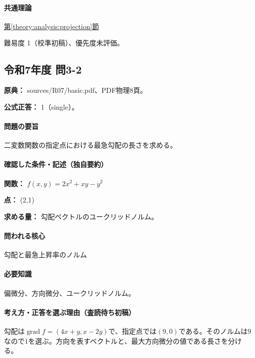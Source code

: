 \paragraph{共通理論} \hyperref[theory:analysis:projection]{第\ref*{theory:analysis:projection}節}

\par 難易度 1（校準初稿）、優先度未評価。

\subsection{令和7年度 問3-2}
\label{q:r07-reg-basic-3-2}

\noindent\textbf{原典：} sources/R07/basic.pdf、PDF物理8頁。

\textbf{公式正答：} 1（single）。

\paragraph{問題の要旨} 二変数関数の指定点における最急勾配の長さを求める。

\paragraph{確認した条件・記述（独自要約）}\mbox{}\par

\noindent\textbf{関数：} \(f(x,y)=2x^2+xy-y^2\)\par

\noindent\textbf{点：} (2,1)\par

\noindent\textbf{求める量：} 勾配ベクトルのユークリッドノルム。\par

\paragraph{問われる核心} 勾配と最急上昇率のノルム

\paragraph{必要知識} 偏微分、方向微分、ユークリッドノルム。

\paragraph{考え方・正答を選ぶ理由（査読待ち初稿）} 勾配は\(\operatorname{grad}f=(4x+y,x-2y)\)で、指定点では\((9,0)\)である。そのノルムは\(9\)なので1を選ぶ。方向を表すベクトルと、最大方向微分の値である長さを分ける。

